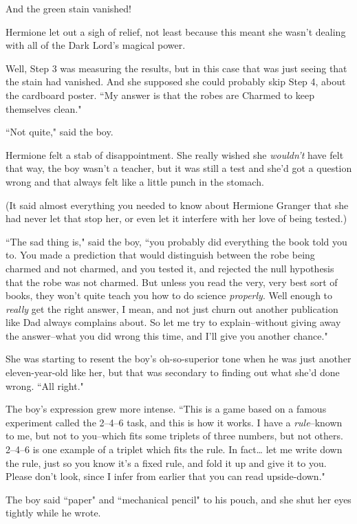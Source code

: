 And the green stain vanished!

Hermione let out a sigh of relief, not least because this meant she wasn't dealing with all of the Dark Lord's magical power.

Well, Step 3 was measuring the results, but in this case that was just seeing that the stain had vanished. And she supposed she could probably skip Step 4, about the cardboard poster. ``My answer is that the robes are Charmed to keep themselves clean."

``Not quite," said the boy.

Hermione felt a stab of disappointment. She really wished she \emph{wouldn't} have felt that way, the boy wasn't a teacher, but it was still a test and she'd got a question wrong and that always felt like a little punch in the stomach.

(It said almost everything you needed to know about Hermione Granger that she had never let that stop her, or even let it interfere with her love of being tested.)

``The sad thing is," said the boy, ``you probably did everything the book told you to. You made a prediction that would distinguish between the robe being charmed and not charmed, and you tested it, and rejected the null hypothesis that the robe was not charmed. But unless you read the very, very best sort of books, they won't quite teach you how to do science \emph{properly}. Well enough to \emph{really} get the right answer, I mean, and not just churn out another publication like Dad always complains about. So let me try to explain\---without giving away the answer\---what you did wrong this time, and I'll give you another chance."

She was starting to resent the boy's oh-so-superior tone when he was just another eleven-year-old like her, but that was secondary to finding out what she'd done wrong. ``All right."

The boy's expression grew more intense. ``This is a game based on a famous experiment called the 2--4--6 task, and this is how it works. I have a \emph{rule}\---known to me, but not to you\---which fits some triplets of three numbers, but not others. 2--4--6 is one example of a triplet which fits the rule. In fact{\ldots} let me write down the rule, just so you know it's a fixed rule, and fold it up and give it to you. Please don't look, since I infer from earlier that you can read upside-down."

The boy said ``paper" and ``mechanical pencil" to his pouch, and she shut her eyes tightly while he wrote.


